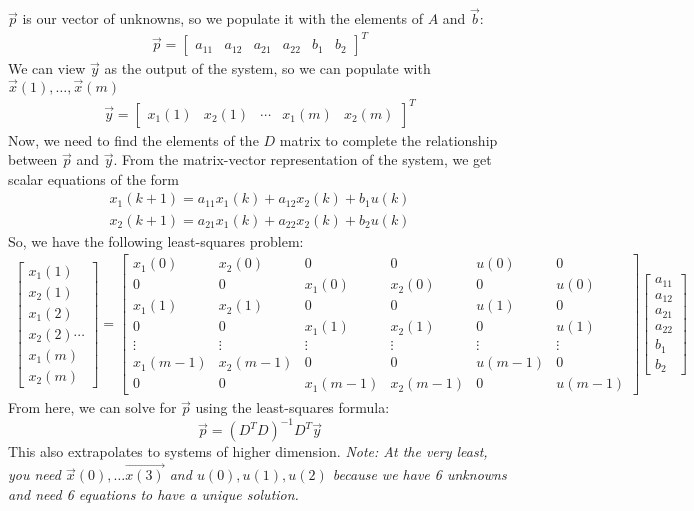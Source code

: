 $\vec{p}$ is our vector of unknowns, so we populate it with the elements of $A$ and $\vec{b}$:
\begin{align*}
    \vec{p} = \begin{bmatrix}
        a_{11} & a_{12} & a_{21} & a_{22} & b_1 & b_2
    \end{bmatrix}^T
\end{align*}
We can view $\vec{y}$ as the output of the system, so we can populate with $\vec{x}(1), \dots, \vec{x}(m)$
\begin{align*}
    \vec{y} = \begin{bmatrix}
        x_1(1) & x_2(1) & \cdots & x_1(m) & x_2(m)
    \end{bmatrix}^T
\end{align*}
Now, we need to find the elements of the $D$ matrix to complete the relationship between $\vec{p}$ and $\vec{y}$. 
From the matrix-vector representation of the system, we get scalar equations of the form
\begin{align*}
    x_1(k + 1) = a_{11} x_1(k) + a_{12} x_2(k) + b_1 u(k) \\
    x_2(k + 1) = a_{21} x_1(k) + a_{22} x_2(k) + b_2 u(k) 
\end{align*}
So, we have the following least-squares problem:
\begin{align*}
    \begin{bmatrix}
        x_1(1) \\ x_2(1) \\ x_1(2) \\ x_2(2) \cdots \\ x_1(m) \\ x_2(m)
    \end{bmatrix} = \begin{bmatrix}
        x_1(0) & x_2(0) & 0 & 0 & u(0) & 0 \\
        0 & 0 & x_1(0) & x_2(0) & 0 & u(0) \\
        x_1(1) & x_2(1) & 0 & 0 & u(1) & 0 \\
        0 & 0 & x_1(1) & x_2(1) & 0 & u(1) \\
        \vdots & \vdots & \vdots & \vdots & \vdots & \vdots \\
        x_1(m - 1) & x_2(m - 1) & 0 & 0 & u(m - 1) & 0 \\
        0 & 0 & x_1(m - 1) & x_2(m - 1) & 0 & u(m - 1)
    \end{bmatrix} \begin{bmatrix}
        a_{11} \\ a_{12} \\ a_{21} \\ a_{22} \\ b_1 \\ b_2
    \end{bmatrix}
\end{align*}
From here, we can solve for $\vec{p}$ using the least-squares formula:
$$\boxed{\vec{p} = (D^T D)^{-1} D^T \vec{y}}$$
This also extrapolates to systems of higher dimension.
\newline
\textit{Note: At the very least, you need $\vec{x}(0), \dots \vec{x(3)}$ and $u(0), u(1), u(2)$ because we have 6 unknowns and need 6 equations to have a unique solution.}

